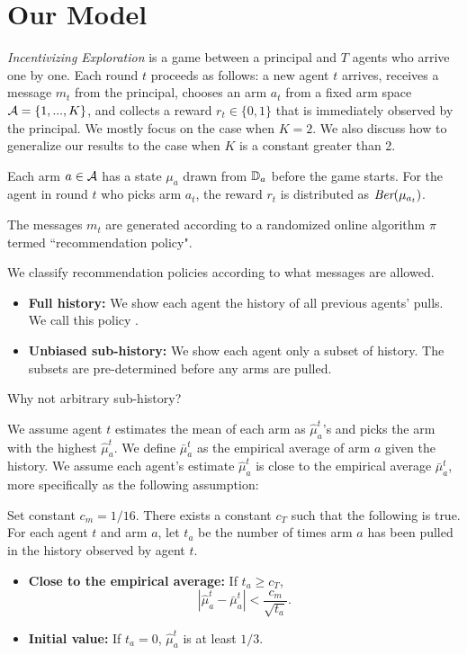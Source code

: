 \section{Our Model}
\label{sec:model}

\emph{Incentivizing Exploration} is a game between a principal and $T$ agents who arrive one by one. Each round $t$ proceeds as follows: a new agent $t$ arrives, receives a message $m_t$ from the principal, chooses an arm $a_t$ from a fixed arm space $\mathcal{A} = \{1,...,K\}$, and collects a reward $r_t\in \{0,1\}$ that is immediately observed by the principal. 
We mostly focus on the case when $K=2$. We also discuss how to generalize our results to the case when $K$ is a constant greater than 2.

Each arm $a \in \mathcal{A}$ has a state $\mu_a$ drawn from $\mathbb{D}_a$ before the game starts. For the agent in round $t$ who picks arm $a_t$, the reward $r_t$ is distributed as $\emph{Ber}(\mu_{a_t})$.  

The messages $m_t$ are generated according to a randomized online algorithm $\pi$ termed ``recommendation policy".

 We classify recommendation policies according to what messages are allowed. 
\begin{itemize}
\item \textbf{Full history:} We show each agent the history of all previous agents' pulls. We call this policy \ALGG. 
\item \textbf{Unbiased sub-history:} We show each agent only a subset of history. The subsets are pre-determined before any arms are pulled.  
\end{itemize}

\begin{remark}
Why not arbitrary sub-history?
\end{remark}

 We assume agent $t$ estimates the mean of each arm as $\hat{\mu}_a^t$'s and picks the arm with the highest $\hat{\mu}_a^t$. We define $\bar{\mu}_a^t$ as the empirical average of arm $a$ given the history. We assume each agent's estimate $\hat{\mu}_a^t$ is close to the empirical average $\bar{\mu}_a^t$, more specifically as the following assumption:
\begin{assumption}
\label{ass:embehave}
Set constant $c_m = 1/16$. There exists a constant $c_T$ such that the following is true. For each agent $t$ and arm $a$, let $t_a$ be the number of times arm $a$ has been pulled in the history observed by agent $t$. 
\begin{itemize}
\item \textbf{Close to the empirical average:} If $t_a \geq c_T$, 
\[
|\hat{\mu}^t_a - \bar{\mu}^t_a | < \frac{c_m}{\sqrt{t_a}}.
\]
\item \textbf{Initial value:} If $t_a = 0$, $\hat{\mu}^t_a$ is at least $1/3$. 
\end{itemize}
\end{assumption}

